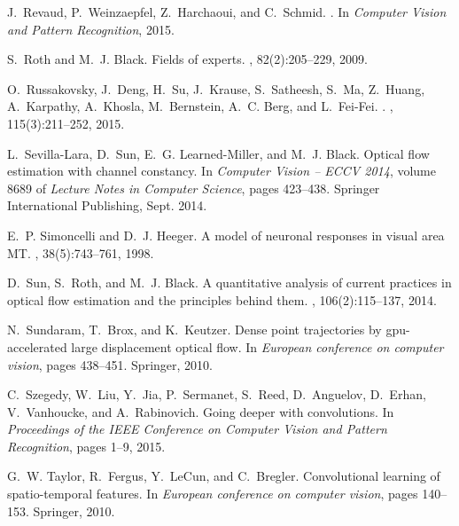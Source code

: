 \documentclass[10pt,twocolumn,letterpaper]{article}
\begin{document}
\begin{thebibliography}{10}
J.~Revaud, P.~Weinzaepfel, Z.~Harchaoui, and C.~Schmid.
.
\newblock In {\em {Computer Vision and Pattern Recognition}}, 2015.

S.~Roth and M.~J. Black.
\newblock Fields of experts.
, 82(2):205--229, 2009.

O.~Russakovsky, J.~Deng, H.~Su, J.~Krause, S.~Satheesh, S.~Ma, Z.~Huang,
  A.~Karpathy, A.~Khosla, M.~Bernstein, A.~C. Berg, and L.~Fei-Fei.
.
,
  115(3):211--252, 2015.

L.~Sevilla-Lara, D.~Sun, E.~G. Learned-Miller, and M.~J. Black.
\newblock Optical flow estimation with channel constancy.
\newblock In {\em Computer Vision -- ECCV 2014}, volume 8689 of {\em Lecture
  Notes in Computer Science}, pages 423--438. Springer International
  Publishing, Sept. 2014.

E.~P. Simoncelli and D.~J. Heeger.
\newblock A model of neuronal responses in visual area {MT}.
, 38(5):743--761, 1998.

D.~Sun, S.~Roth, and M.~J. Black.
\newblock A quantitative analysis of current practices in optical flow
  estimation and the principles behind them.
, 106(2):115--137,
  2014.

N.~Sundaram, T.~Brox, and K.~Keutzer.
\newblock Dense point trajectories by gpu-accelerated large displacement
  optical flow.
\newblock In {\em European conference on computer vision}, pages 438--451.
  Springer, 2010.

C.~Szegedy, W.~Liu, Y.~Jia, P.~Sermanet, S.~Reed, D.~Anguelov, D.~Erhan,
  V.~Vanhoucke, and A.~Rabinovich.
\newblock Going deeper with convolutions.
\newblock In {\em Proceedings of the IEEE Conference on Computer Vision and
  Pattern Recognition}, pages 1--9, 2015.

G.~W. Taylor, R.~Fergus, Y.~LeCun, and C.~Bregler.
\newblock Convolutional learning of spatio-temporal features.
\newblock In {\em European conference on computer vision}, pages 140--153.
  Springer, 2010.


\end{thebibliography}
\end{document}
